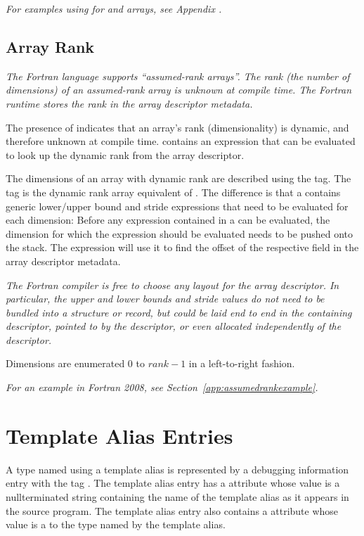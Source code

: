 \textit{For examples using 
 for  and 
arrays, 
see Appendix .}

\subsection{Array Rank}
\label{chap:DWATrank}
\textit{The Fortran language supports ``assumed-rank arrays''. The
  rank (the number of dimensions) of an assumed-rank array is unknown
  at compile time. The Fortran runtime stores the rank in the array
  descriptor metadata.}

The presence of \DWATrank{} indicates that an array's rank
(dimensionality) is dynamic, and therefore unknown at compile
time. \DWATrank{} contains an expression that can be evaluated to look
up the dynamic rank from the array descriptor.

The dimensions of an array with dynamic rank are described using the
\DWTAGgenericsubrange{} tag. The \DWTAGgenericsubrange{} tag is the
dynamic rank array equivalent of
. The
difference is that a \DWTAGgenericsubrange{} contains generic
lower/upper bound and stride expressions that need to be evaluated for
each dimension: Before any expression contained in a
\DWTAGgenericsubrange{} can be evaluated, the dimension for which the
expression should be evaluated needs to be pushed onto the stack. The
expression will use it to find the offset of the respective field in
the array descriptor metadata.

\textit{The Fortran compiler is free to choose any layout for the
  array descriptor. In particular, the upper and lower bounds and
  stride values do not need to be bundled into a structure or record,
  but could be laid end to end in the containing descriptor, pointed
  to by the descriptor, or even allocated independently of the
  descriptor.}

Dimensions are enumerated $0$ to $\mathit{rank}-1$ in a left-to-right
fashion.

\textit{For an example in Fortran 2008, see
  Section~\ref{app:assumedrankexample}.}


\section{Template Alias Entries}
\label{chap:templatealiasentries}

A type named using a template alias is represented
by a debugging information entry 
with the tag
. 
The template alias entry has a
 attribute 
whose value is a null\dash terminated string
containing the name of the template alias as it appears in
the source program. The template alias entry also contains 
a
 attribute 
whose value is a 
to the type named by the template alias. 

